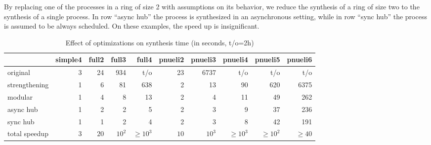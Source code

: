 By replacing one of the processes in a ring of size 2 with assumptions on its behavior,
we reduce the synthesis of a ring of size two to the synthesis of a single process.
In row ``async hub'' the process is synthesized in an asynchronous setting,
while in row ``sync hub'' the process is assumed to be always scheduled.
On these examples, the speed up is insignificant.

\begin{table}[tb]
\caption{Effect of optimizations on synthesis time (in seconds, t/o=2h)}
\label{tok_rings:tab:opt}
\small
\centering
\setlength{\tabcolsep}{3pt}
\begin{tabular}{ lrrrrrrrrr }
\toprule
 & simple4 & full2 & full3 & full4 & pnueli2 & pnueli3 & pnueli4 & pnueli5 & pnueli6 \\
\midrule
original          & 3 & 24   & 934 & t/o & 23 & 6737 & t/o & t/o & t/o\\
strengthening    & 1 & 6 & 81 & 638 & 2 & 13 & 90 & 620 & 6375 \\
modular           & 1 & 4 & 8 & 13 & 2 & 4 & 11 & 49 & 262 \\
async hub               & 1 & 2 & 2 & 5 & 2 & 3 & 9 & 37 & 236 \\
sync hub                & 1 & 1 & 2 & 4 & 2 & 3 & 8 & 42 & 191 \\
\midrule
total speedup      & $3$ & $20$ & $10^2$ & $\ge\!\!10^3$ & $10$ & $10^3$ & $\ge\!\!10^3$ & $\ge\!\!10^2$ & $\ge\!\!40$ \\
\bottomrule
\end{tabular}
\end{table}

